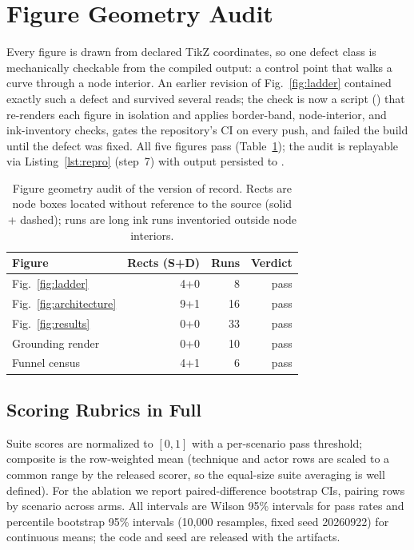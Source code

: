 \section{Figure Geometry Audit}
\label{app:figaudit}
Every figure is drawn from declared TikZ coordinates, so one defect
class is mechanically checkable from the compiled output: a control
point that walks a curve through a node interior. An earlier revision
of Fig.~\ref{fig:ladder} contained exactly such a defect and survived
several reads; the check is now a script
() that re-renders each figure
in isolation and applies border-band, node-interior, and ink-inventory
checks, gates the repository's CI on every push, and failed the build
until the defect was fixed. All five figures pass
(Table~\ref{tab:figaudit}); the audit is replayable via
Listing~\ref{lst:repro} (step~7) with output persisted to
.

\begin{table}[!t]
\centering
\caption{Figure geometry audit of the version of record. Rects are node
boxes located without reference to the source (solid + dashed); runs are
long ink runs inventoried outside node interiors.}
\label{tab:figaudit}
\scriptsize
\setlength{\tabcolsep}{4pt}
\begin{tabular}{lrrr}
\toprule
Figure & Rects (S+D) & Runs & Verdict \\
\midrule
Fig.~\ref{fig:ladder} & 4+0 & 8 & pass \\
Fig.~\ref{fig:architecture} & 9+1 & 16 & pass \\
Fig.~\ref{fig:results} & 0+0 & 33 & pass \\
Grounding render & 0+0 & 10 & pass \\
Funnel census & 4+1 & 6 & pass \\
\bottomrule
\end{tabular}
\end{table}


\subsection{Scoring Rubrics in Full}
\label{app:rubric-detail}

Suite scores are normalized to $[0,1]$ with a per-scenario pass threshold;
composite is the row-weighted mean (technique and actor rows are scaled
to a common range by the released scorer, so the equal-size suite
averaging is well defined). For the ablation we report
paired-difference bootstrap CIs, pairing rows by scenario across arms.
All intervals are Wilson 95\% intervals for pass rates and percentile
bootstrap 95\% intervals (10{,}000 resamples, fixed seed 20260922) for
continuous means; the code and seed are released with the artifacts.

